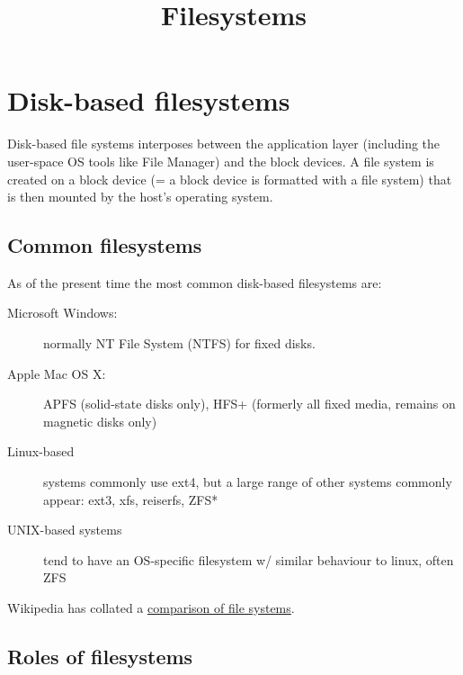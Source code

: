 \documentclass[slides]{pgnotes}
\title{Filesystems}
\begin{document}
\maketitle

\tableofcontents

\section{Disk-based filesystems}
\label{sec:disk-based-filesystems}

Disk-based file systems interposes between the application layer
(including the user-space OS tools like File Manager) and the block
devices. A file system is created on a block device (= a block device is
formatted with a file system) that is then mounted by the host's
operating system.

\subsection{Common filesystems}
\label{sec:common-filesystems}

As of the present time the most common disk-based filesystems are:

\begin{description}
\item[Microsoft Windows:]
normally NT File System (NTFS) for fixed disks.
\item[Apple Mac OS X:]
APFS (solid-state disks only), HFS+ (formerly all fixed media, remains
on magnetic disks only)
\item[Linux-based]
systems commonly use ext4, but a large range of other systems commonly
appear: ext3, xfs, reiserfs, ZFS*
\item[UNIX-based systems]
tend to have an OS-specific filesystem w/ similar behaviour to linux,
often ZFS
\end{description}

Wikipedia has collated a
\href{https://en.wikipedia.org/wiki/Comparison_of_file_systems}{comparison
of file systems}.

\subsection{Roles of filesystems}\label{sec:roles-of-filesystems}
\end{document}
